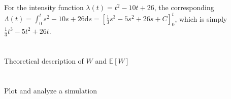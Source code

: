 \documentclass[11pt, oneside]{article}   	%
\begin{document}
For the intensity function $\lambda(t) = t^2 - 10 t + 26$, the corresponding $\Lambda(t) = \int_{0}^{t} s^2 - 10 s + 26 \mathrm{d}s = \left[ \frac{1}{3}s^3 - 5 s^2 + 26 s + C \right]_{0}^{t}$, which is simply $\frac{1}{3}t^3 - 5 t^2 + 26 t $.

\section{}
Theoretical description of $W$ and $\mathbb{E}[W]$

\section{}
Plot and analyze a simulation
\end{document}
